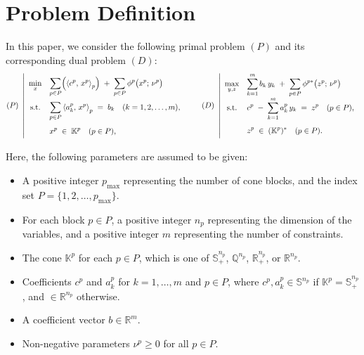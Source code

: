 \section{Problem Definition}

In this paper, we consider the following primal problem \((P)\) and its corresponding dual problem \((D)\):
\begin{equation*}
    \everymath{\displaystyle}
    \renewcommand{\arraystretch}{2.0}
    (P)~
    \left|
    \begin{array}{cl}
         \min_{x} & \displaystyle 
             \sum_{p \in P} \Bigl(\inprod{c^p}{x^p}_p\Bigr) 
             \;+\;\sum_{p \in P} \phi^p\bigl(x^p;\,\nu^p\bigr) \\[3pt]
         \text{s.t.} 
         & \displaystyle 
             \sum_{p \in P} \inprod{a^p_{k}}{x^p}_p 
             \;=\; b_k \quad (k= 1,2,\ldots,m), \\[3pt]
         & x^p \;\in\; \mathbb{K}^p \quad (p\in P),
    \end{array}
    \right.
    \qquad
    (D)~
    \left|
    \begin{array}{cl}
         \max_{y,z} & \displaystyle 
            \sum_{k=1}^m b_k\, y_k 
            \;+\;\sum_{p \in P} \phi^{p*}\bigl(z^p;\,\nu^p\bigr) \\[3pt]
         \text{s.t.} 
         & \displaystyle 
            c^p \;-\; \sum_{k=1}^m a^p_k\,y_k \;=\; z^p \quad (p\in P), \\[3pt]
         & z^p \;\in\; (\mathbb{K}^p)^* \quad (p\in P).
    \end{array}
    \right.
\end{equation*}

Here, the following parameters are assumed to be given:
\begin{itemize}
    \item A positive integer $p_{\max}$ representing the number of cone blocks, and the index set $P = \{1, 2, \ldots, p_{\max}\}$.
    \item For each block $p \in P$, a positive integer $n_p$ representing the dimension of the variables, and a positive integer $m$ representing the number of constraints.
    \item The cone $\mathbb{K}^p$ for each $p \in P$, which is one of $\mathbb{S}^{n_p}_+$, $\mathbb{Q}^{n_p}$, $\mathbb{R}^{n_p}_+$, or $\mathbb{R}^{n_p}$.
    \item Coefficients $c^p$ and $a^p_k$ for $k = 1, \ldots, m$ and $p \in P$, where $c^p, a^p_k \in \mathbb{S}^{n_p}$ if $\mathbb{K}^p = \mathbb{S}^{n_p}_+$, and $\in \mathbb{R}^{n_p}$ otherwise.
    \item A coefficient vector $b \in \mathbb{R}^m$.
    \item Non-negative parameters $\nu^p \ge 0$ for all $p \in P$.
\end{itemize}

